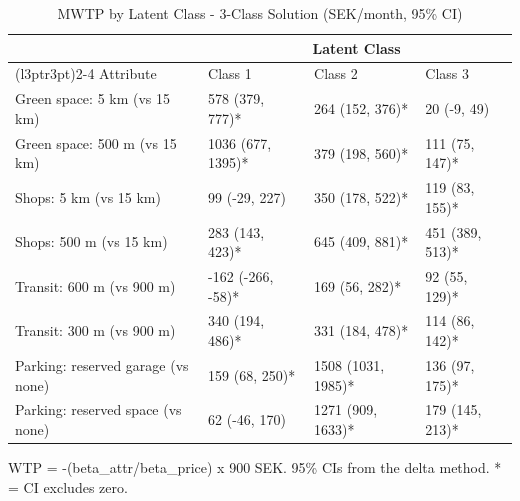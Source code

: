 \begin{table}[!h]
\centering
\caption{MWTP by Latent Class - 3-Class Solution (SEK/month, 95\% CI)}
\centering
\begin{threeparttable}
\begin{tabular}[t]{llll}
\toprule
\multicolumn{1}{c}{ } & \multicolumn{3}{c}{Latent Class} \\
\cmidrule(l{3pt}r{3pt}){2-4}
Attribute & Class 1 & Class 2 & Class 3\\
\midrule
Green space: 5 km (vs 15 km) & 578 (379, 777)* & 264 (152, 376)* & 20 (-9, 49)\\
Green space: 500 m (vs 15 km) & 1036 (677, 1395)* & 379 (198, 560)* & 111 (75, 147)*\\
Shops: 5 km (vs 15 km) & 99 (-29, 227) & 350 (178, 522)* & 119 (83, 155)*\\
Shops: 500 m (vs 15 km) & 283 (143, 423)* & 645 (409, 881)* & 451 (389, 513)*\\
Transit: 600 m (vs 900 m) & -162 (-266, -58)* & 169 (56, 282)* & 92 (55, 129)*\\
\addlinespace
Transit: 300 m (vs 900 m) & 340 (194, 486)* & 331 (184, 478)* & 114 (86, 142)*\\
Parking: reserved garage (vs none) & 159 (68, 250)* & 1508 (1031, 1985)* & 136 (97, 175)*\\
Parking: reserved space (vs none) & 62 (-46, 170) & 1271 (909, 1633)* & 179 (145, 213)*\\
\bottomrule
\end{tabular}
\begin{tablenotes}
\item WTP = -(beta\_attr/beta\_price) x 900 SEK. 95\% CIs from the delta method. * = CI excludes zero.
\end{tablenotes}
\end{threeparttable}
\end{table}
